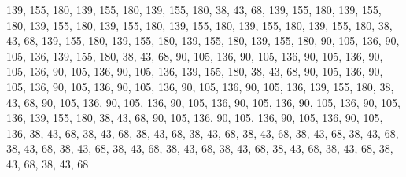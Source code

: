 139, 155, 180, 139, 155, 180, 139, 155, 180, 38, 43, 68, 139, 155, 180, 139,
155, 180, 139, 155, 180, 139, 155, 180, 139, 155, 180, 139, 155, 180, 139, 155,
180, 38, 43, 68, 139, 155, 180, 139, 155, 180, 139, 155, 180, 139, 155, 180,
90, 105, 136, 90, 105, 136, 139, 155, 180, 38, 43, 68, 90, 105, 136, 90,
105, 136, 90, 105, 136, 90, 105, 136, 90, 105, 136, 90, 105, 136, 139, 155,
180, 38, 43, 68, 90, 105, 136, 90, 105, 136, 90, 105, 136, 90, 105, 136,
90, 105, 136, 90, 105, 136, 139, 155, 180, 38, 43, 68, 90, 105, 136, 90,
105, 136, 90, 105, 136, 90, 105, 136, 90, 105, 136, 90, 105, 136, 139, 155,
180, 38, 43, 68, 90, 105, 136, 90, 105, 136, 90, 105, 136, 90, 105, 136,
38, 43, 68, 38, 43, 68, 38, 43, 68, 38, 43, 68, 38, 43, 68, 38,
43, 68, 38, 43, 68, 38, 43, 68, 38, 43, 68, 38, 43, 68, 38, 43,
68, 38, 43, 68, 38, 43, 68, 38, 43, 68, 38, 43, 68, 38, 43, 68
